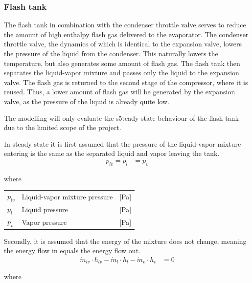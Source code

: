 \subsubsection{Flash tank}
The flash tank in combination with the condenser throttle valve serves to reduce the amount of high enthalpy flash gas delivered to the evaporator. The condenser throttle valve, the dynamics of which is identical to the expansion valve, lowers the pressure of the liquid from the condenser. This naturally lowers the temperature, but also generates some amount of flash gas. The flash tank then separates the liquid-vapor mixture and passes only the liquid to the expansion valve. The flash gas is returned to the second stage of the compressor, where it is reused. Thus, a lower amount of flash gas will be generated by the expansion valve, as the pressure of the liquid is already quite low.

The modelling will only evaluate the s5teady state behaviour of the flash tank due to the limited scope of the project. 

In steady state it is first assumed that the pressure of the liquid-vapor mixture entering is the same as the separated liquid and vapor leaving the tank. 
\begin{align}
	p_{lv} 	= p_{l}					&  = p_{v} 
	\label{eq:Flash_tank_pressure}
\end{align}

where 

\begin{center}
	\begin{tabular}{l p{8cm} l}
		$p_{lv}$				&  Liquid-vapor mixture pressure		& [\si{Pa}]\\
		$p_{l}$					&  Liquid pressure 						& [\si{Pa}] \\
		$p_{v}$					&  Vapor pressure						& [\si{Pa}]\\
		
	\end{tabular}
\end{center}


Secondly, it is assumed that the energy of the mixture does not change, meaning the energy flow in equals the energy flow out. 
\begin{align}
	\dot{m}_{lv} \cdot  h_{lv}  - \dot{m}_{l} \cdot  h_{l} - \dot{m}_{v} \cdot  h_{v} & = 0
	\label{eq:Flash_tank_energyflow} 
\end{align}

where 

